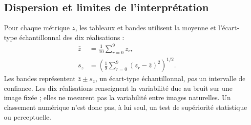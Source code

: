 \subsection{Dispersion et limites de l'interprétation}

Pour chaque métrique $z$, les tableaux et bandes utilisent la moyenne et
l'écart-type échantillonnal des dix réalisations :
\begin{equation}
 \begin{aligned}
  \bar z&=\frac1{10}\sum_{r=0}^{9}z_r,\\
  s_z&=\left(\frac1{9}\sum_{r=0}^{9}(z_r-\bar z)^2\right)^{1/2}.
 \end{aligned}
 \label{eq:sample-aggregation}
\end{equation}
Les bandes représentent $\bar z\pm s_z$, un écart-type échantillonnal,
\emph{pas} un intervalle de confiance. Les dix réalisations renseignent
la variabilité due au bruit sur une image fixée ; elles ne mesurent pas
la variabilité entre images naturelles. Un classement numérique n'est
donc pas, à lui seul, un test de supériorité statistique ou perceptuelle.
